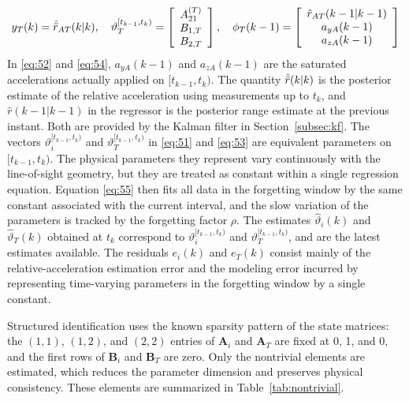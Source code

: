 \begin{equation}
\label{eq:54}
{y_T}(k) = \hatddot{r}_{AT}(k|k),\quad \vartheta _T^{[{t_{k - 1}},{t_k})} = \left[ {\begin{array}{*{20}{c}}
  {A_{21}^{(T)}} \\ 
  {{B_{1,T}}} \\ 
  {{B_{2,T}}} 
\end{array}} \right],\quad {\phi _T}(k - 1) = \left[ {\begin{array}{*{20}{c}}
  {{{\hat r}_{AT}}(k - 1|k - 1)} \\ 
  {{a_{yA}}(k - 1)} \\ 
  {{a_{zA}}(k - 1)} 
\end{array}} \right]
\end{equation}
In \eqref{eq:52} and \eqref{eq:54}, ${a_{yA}}(k - 1)$ and ${a_{zA}}(k - 1)$ are the saturated accelerations actually applied on $[{t_{k - 1}},{t_k})$. The quantity $\hat{\ddot{r}}(k|k)$ is the posterior estimate of the relative acceleration using measurements up to ${t_k}$, and $\hat r(k - 1|k - 1)$ in the regressor is the posterior range estimate at the previous instant. Both are provided by the Kalman filter in Section~\ref{subsec:kf}. The vectors $\vartheta _i^{[{t_{k - 1}},{t_k})}$ and $\vartheta _T^{[{t_{k - 1}},{t_k})}$ in \eqref{eq:51} and \eqref{eq:53} are equivalent parameters on $[{t_{k - 1}},{t_k})$. The physical parameters they represent vary continuously with the line-of-sight geometry, but they are treated as constant within a single regression equation. Equation \eqref{eq:55} then fits all data in the forgetting window by the same constant associated with the current interval, and the slow variation of the parameters is tracked by the forgetting factor $\rho$. The estimates $\hat{\vartheta}_{i}(k)$ and $\hat{\vartheta}_{T}(k)$ obtained at ${t_k}$ correspond to $\vartheta _i^{[{t_{k - 1}},{t_k})}$ and $\vartheta _T^{[{t_{k - 1}},{t_k})}$, and are the latest estimates available. The residuals ${e_i}(k)$ and ${e_T}(k)$ consist mainly of the relative-acceleration estimation error and the modeling error incurred by representing time-varying parameters in the forgetting window by a single constant.

Structured identification uses the known sparsity pattern of the state matrices: the $(1,1)$, $(1,2)$, and $(2,2)$ entries of ${{\mathbf{A}}_i}$ and ${{\mathbf{A}}_T}$ are fixed at 0, 1, and 0, and the first rows of ${{\mathbf{B}}_i}$ and ${{\mathbf{B}}_T}$ are zero. Only the nontrivial elements are estimated, which reduces the parameter dimension and preserves physical consistency. These elements are summarized in Table~\ref{tab:nontrivial}.

